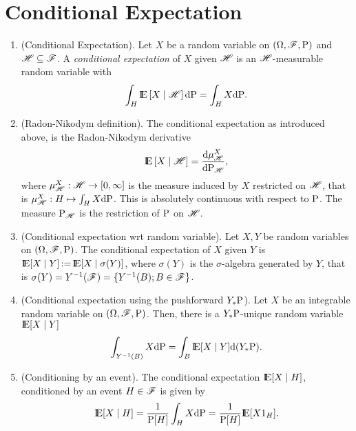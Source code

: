 \documentclass[a4paper,10pt]{article}
\newcommand{\ce}[1]{\E\left[#1 {}\mid{} \H \right]}
\begin{document}
\section{Conditional Expectation}
\begin{enumerate}
 \item (Conditional Expectation). Let $X$ be a random variable on $(\Omega,\mathscr{F},\mathrm{P})$ and $\mathscr{H}\subseteq \mathscr{F}$.
       A \textit{conditional expectation} of $X$ given $\mathscr{H}$ is an $\mathscr{H}$-measurable 
       random variable with
       \[
        \int_H \ce{X} \d\prob = \int_H X\d\prob.
       \]
 \item (Radon-Nikodym definition). The conditional expectation as introduced above, is the Radon-Nikodym
       derivative
       \[
          \ce{X} = \frac{\d \mu^X_{\H}}{\d \prob_{\H}},
       \]
      where $\mu^X_{\mathscr{H}}:\mathscr{H}\to [0,\infty]$ is the measure induced by $X$
      restricted on $\mathscr{H}$, that is $\mu^X_{\mathscr{H}}:H\mapsto \int_H X\mathrm{d}\mathrm{P}$.
      This is absolutely continuous with respect to $\mathrm{P}$. The measure $\mathrm{P}_{\mathscr{H}}$
      is the restriction of $\mathrm{P}$ on $\mathscr{H}$. 
      
 \item (Conditional expectation wrt random variable). Let $X,Y$ be random variables on $(\Omega,\mathscr{F},\mathrm{P})$.
       The conditional expectation of $X$ given $Y$ is $\E[X\mid Y]\dfn \E[X\mid \sigma(Y)]$,
       where $\sigma(Y)$ is the $\sigma$-algebra generated by $Y$, that is 
       $\sigma(Y) = Y^{-1}(\mathscr{F}) = \{Y^{-1}(B); B\in\mathscr{F}\}$.
       
 \item (Conditional expectation using the pushforward $Y_*\mathrm{P}$). 
       Let $X$ be an integrable random variable on $(\Omega,\mathscr{F},\mathrm{P})$. Then, there is a $Y_*\mathrm{P}$-unique 
       random variable $\E[X\mid Y]$
       \[
        \int_{Y^{-1}(B)} X\d \prob = \int_B \E[X{}\mid{}Y]\d(Y_*\prob).
       \]

 \item (Conditioning by an event). The conditional expectation $\E[X\mid H]$, conditioned
       by an event $H\in\mathscr{F}$ is given by
       \[
        \E[X\mid H] = \frac{1}{\prob[H]}\int_H X\d\prob = \frac{1}{\prob[H]}\E[X1_H].
       \]


\end{enumerate}
\end{document}
